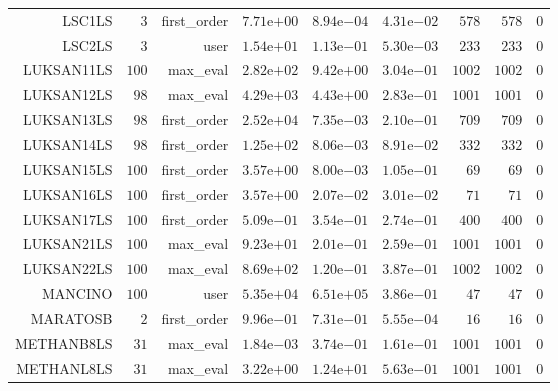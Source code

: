 \begin{longtable}{rrrrrrrrr}
LSC1LS & \(     3\) & first\_order & \( 7.71\)e\(+00\) & \( 8.94\)e\(-04\) & \( 4.31\)e\(-02\) & \(   578\) & \(   578\) & \(     0\) \\
LSC2LS & \(     3\) & user & \( 1.54\)e\(+01\) & \( 1.13\)e\(-01\) & \( 5.30\)e\(-03\) & \(   233\) & \(   233\) & \(     0\) \\
LUKSAN11LS & \(   100\) & max\_eval & \( 2.82\)e\(+02\) & \( 9.42\)e\(+00\) & \( 3.04\)e\(-01\) & \(  1002\) & \(  1002\) & \(     0\) \\
LUKSAN12LS & \(    98\) & max\_eval & \( 4.29\)e\(+03\) & \( 4.43\)e\(+00\) & \( 2.83\)e\(-01\) & \(  1001\) & \(  1001\) & \(     0\) \\
LUKSAN13LS & \(    98\) & first\_order & \( 2.52\)e\(+04\) & \( 7.35\)e\(-03\) & \( 2.10\)e\(-01\) & \(   709\) & \(   709\) & \(     0\) \\
LUKSAN14LS & \(    98\) & first\_order & \( 1.25\)e\(+02\) & \( 8.06\)e\(-03\) & \( 8.91\)e\(-02\) & \(   332\) & \(   332\) & \(     0\) \\
LUKSAN15LS & \(   100\) & first\_order & \( 3.57\)e\(+00\) & \( 8.00\)e\(-03\) & \( 1.05\)e\(-01\) & \(    69\) & \(    69\) & \(     0\) \\
LUKSAN16LS & \(   100\) & first\_order & \( 3.57\)e\(+00\) & \( 2.07\)e\(-02\) & \( 3.01\)e\(-02\) & \(    71\) & \(    71\) & \(     0\) \\
LUKSAN17LS & \(   100\) & first\_order & \( 5.09\)e\(-01\) & \( 3.54\)e\(-01\) & \( 2.74\)e\(-01\) & \(   400\) & \(   400\) & \(     0\) \\
LUKSAN21LS & \(   100\) & max\_eval & \( 9.23\)e\(+01\) & \( 2.01\)e\(-01\) & \( 2.59\)e\(-01\) & \(  1001\) & \(  1001\) & \(     0\) \\
LUKSAN22LS & \(   100\) & max\_eval & \( 8.69\)e\(+02\) & \( 1.20\)e\(-01\) & \( 3.87\)e\(-01\) & \(  1002\) & \(  1002\) & \(     0\) \\
MANCINO & \(   100\) & user & \( 5.35\)e\(+04\) & \( 6.51\)e\(+05\) & \( 3.86\)e\(-01\) & \(    47\) & \(    47\) & \(     0\) \\
MARATOSB & \(     2\) & first\_order & \( 9.96\)e\(-01\) & \( 7.31\)e\(-01\) & \( 5.55\)e\(-04\) & \(    16\) & \(    16\) & \(     0\) \\
METHANB8LS & \(    31\) & max\_eval & \( 1.84\)e\(-03\) & \( 3.74\)e\(-01\) & \( 1.61\)e\(-01\) & \(  1001\) & \(  1001\) & \(     0\) \\
METHANL8LS & \(    31\) & max\_eval & \( 3.22\)e\(+00\) & \( 1.24\)e\(+01\) & \( 5.63\)e\(-01\) & \(  1001\) & \(  1001\) & \(     0\) \\

\end{longtable}
